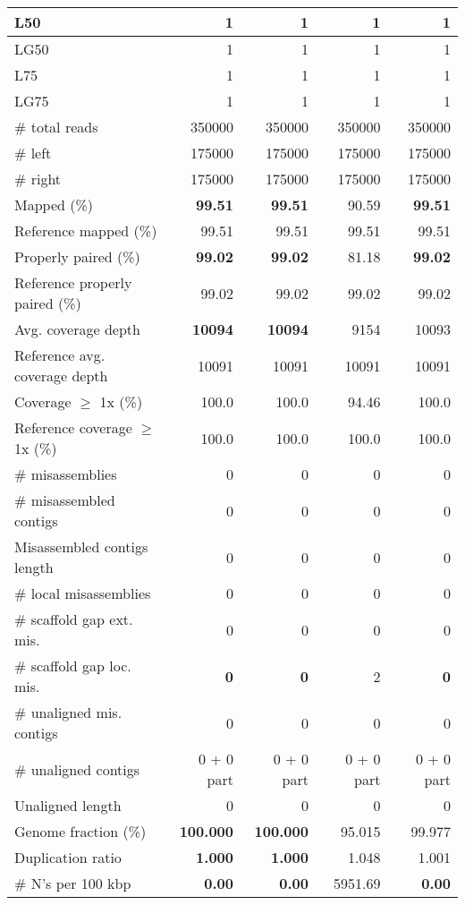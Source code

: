 \documentclass[12pt,a4paper]{article}
\begin{document}
\begin{table}[ht]
\begin{center}
\begin{tabular}{|l*{4}{|r}|}
L50 & 1 & 1 & 1 & 1 \\ \hline
LG50 & 1 & 1 & 1 & 1 \\ \hline
L75 & 1 & 1 & 1 & 1 \\ \hline
LG75 & 1 & 1 & 1 & 1 \\ \hline
\# total reads & 350000 & 350000 & 350000 & 350000 \\ \hline
\# left & 175000 & 175000 & 175000 & 175000 \\ \hline
\# right & 175000 & 175000 & 175000 & 175000 \\ \hline
Mapped (\%) & {\bf 99.51} & {\bf 99.51} & 90.59 & {\bf 99.51} \\ \hline
Reference mapped (\%) & 99.51 & 99.51 & 99.51 & 99.51 \\ \hline
Properly paired (\%) & {\bf 99.02} & {\bf 99.02} & 81.18 & {\bf 99.02} \\ \hline
Reference properly paired (\%) & 99.02 & 99.02 & 99.02 & 99.02 \\ \hline
Avg. coverage depth & {\bf 10094} & {\bf 10094} & 9154 & 10093 \\ \hline
Reference avg. coverage depth & 10091 & 10091 & 10091 & 10091 \\ \hline
Coverage $\geq$ 1x (\%) & 100.0 & 100.0 & 94.46 & 100.0 \\ \hline
Reference coverage $\geq$ 1x (\%) & 100.0 & 100.0 & 100.0 & 100.0 \\ \hline
\# misassemblies & 0 & 0 & 0 & 0 \\ \hline
\# misassembled contigs & 0 & 0 & 0 & 0 \\ \hline
Misassembled contigs length & 0 & 0 & 0 & 0 \\ \hline
\# local misassemblies & 0 & 0 & 0 & 0 \\ \hline
\# scaffold gap ext. mis. & 0 & 0 & 0 & 0 \\ \hline
\# scaffold gap loc. mis. & {\bf 0} & {\bf 0} & 2 & {\bf 0} \\ \hline
\# unaligned mis. contigs & 0 & 0 & 0 & 0 \\ \hline
\# unaligned contigs & 0 + 0 part & 0 + 0 part & 0 + 0 part & 0 + 0 part \\ \hline
Unaligned length & 0 & 0 & 0 & 0 \\ \hline
Genome fraction (\%) & {\bf 100.000} & {\bf 100.000} & 95.015 & 99.977 \\ \hline
Duplication ratio & {\bf 1.000} & {\bf 1.000} & 1.048 & 1.001 \\ \hline
\# N's per 100 kbp & {\bf 0.00} & {\bf 0.00} & 5951.69 & {\bf 0.00} \\ \hline

\end{tabular}
\end{center}
\end{table}
\end{document}
